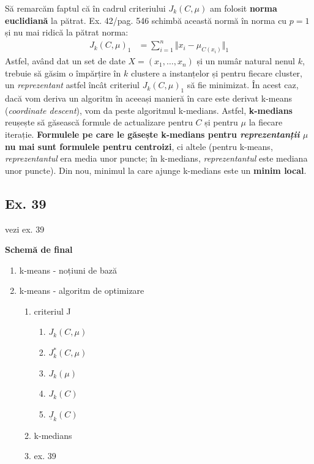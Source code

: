 \documentclass[12pt]{article}
\begin{document}
	Să remarcăm faptul că în cadrul criteriului $J_k(C,\mu)$ am folosit \textbf{norma euclidiană} la pătrat. Ex. 42/pag. 546 schimbă această normă în norma cu $p=1$ și nu mai ridică la pătrat norma:
	\begin{align*}
	J_k(C,\mu)_1 &= \sum_{i=1}^{n} \Vert x_i - \mu_{C(x_i)} \Vert_1
	\end{align*}
	Astfel, având dat un set de date $X = (x_1,\dots,x_n)$ și un numâr natural nenul $k$, trebuie să găsim o împărțire în $k$ clustere a instanțelor și pentru fiecare cluster, un \textit{reprezentant} astfel încât criteriul $J_k(C,\mu)_1$ să fie minimizat. În acest caz, dacă vom deriva un algoritm în aceeași manieră în care este derivat k-means (\textit{coordinate descent}), vom da peste algoritmul k-medians. Astfel, \textbf{k-medians} reușește să găsească formule de actualizare pentru $C$ și pentru $\mu$ la fiecare iterație. \textbf{Formulele pe care le găsește k-medians pentru \textit{reprezentanții} $\mu$ nu mai sunt formulele pentru centroizi}, ci altele (pentru k-means, \textit{reprezentantul} era media unor puncte; în k-medians, \textit{reprezentantul} este mediana unor puncte). Din nou, minimul la care ajunge k-medians este un \textbf{minim local}. 

	\subsection{Ex. 39}
	
	vezi ex. 39

	\newpage
	\textbf{\large{Schemă de final}}
	\begin{enumerate}
		\item k-means - noțiuni de bază
		\item k-means - algoritm de optimizare
		\begin{enumerate}
			\item criteriul J
			\begin{enumerate}
				\item $J_k(C,\mu)$
				\item $J^*_k(C,\mu)$
				\item $J_k(\mu)$
				\item $J_k(C)$
				\item $\underline{J}_k(C)$
			\end{enumerate}
			\item k-medians
			\item ex. 39
		\end{enumerate}
	\end{enumerate}
	

	
\end{document}
